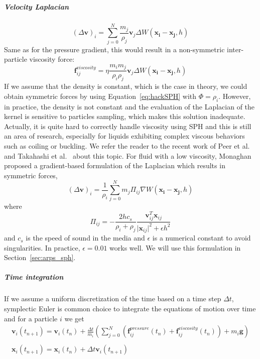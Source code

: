 \subparagraph{Velocity Laplacian}
\begin{equation}
\left(\Delta \mathbf{v}\right)_{i} = \sum_{j=0}^{N} \frac{m_{j}}{\rho_{j}} \mathbf{v}_{j} \Delta W(\mathbf{x_{i}}-\mathbf{x_{j}},h)
\end{equation}
Same as for the pressure gradient, this would result in a non-symmetric inter-particle viscosity force:
\begin{equation}
\label{eq:nonSymmetricViscosityForce}
\mathbf{f}^{viscosity}_{ij} = \eta\frac{m_{i}m_{j}}{\rho_{i}\rho_{j}}\mathbf{v}_{j}\Delta W(\mathbf{x_{i}}-\mathbf{x_{j}},h)
\end{equation}
If we assume that the density is constant, which is the case in theory, we could obtain symmetric forces by using Equation~\eqref{eq:hackSPH} with $\Phi=\rho_{i}$. However, in practice, the density is not constant and the evaluation of the Laplacian of the kernel is sensitive to particles sampling, which makes this solution inadequate.
Actually, it is quite hard to correctly handle viscosity using SPH and this is still an area of research, especially for liquids exhibiting complex viscous behaviors such as coiling or buckling.
We refer the reader to the recent work of Peer et al.~\cite{Peer2015} and Takahashi et al.~\cite{Takahashi2015} about this topic.
For fluid with a low viscosity, Monaghan~\cite{Monaghan2005} proposed a gradient-based formulation of the Laplacian which results in symmetric forces,
\begin{equation}
\label{eq:velocityLaplacianSPH}
\left(\Delta \mathbf{v}\right)_{i} = 
\frac{1}{\rho_{i}}
\sum_{j=0}^{N} m_{j} \Pi_{ij} \nabla W(\mathbf{x_{i}}-\mathbf{x_{j}},h)
\end{equation}
where 
\begin{equation}
    \Pi_{ij} = -\frac{2hc_{s}}{\rho_{i}+\rho_{j}}\frac{\mathbf{v}_{ij}^{T}\mathbf{x}_{ij}}{\vert \mathbf{x}_{ij} \vert^{2} + \epsilon h^{2}}
\end{equation}
and $c_{s}$ is the speed of sound in the media and $\epsilon$ is a numerical constant to avoid singularities.
In practice, $\epsilon=0.01$ works well. We will use this formulation in Section~\ref{sec:arps_sph}.
\subparagraph{Time integration} If we assume a uniform discretization of the time based on a time step $\Delta t$, symplectic Euler is common choice to integrate the equations of motion over time and for a particle $i$ we get
\begin{equation}
\begin{array}{ll}
\displaystyle \mathbf{v}_{i}(t_{n+1}) = \mathbf{v}_{i}(t_{n}) + \frac{\Delta t}{m_{i}}\left( \sum_{j=0}^{N}\left(\mathbf{f}_{ij}^{pressure}(t_{n})+\mathbf{f}_{ij}^{viscosity}(t_{n})\right)+m_{i}\mathbf{g}\right) \\ \\
\displaystyle \mathbf{x}_{i}(t_{n+1}) = \mathbf{x}_{i}(t_{n}) + \Delta t \mathbf{v}_{i}(t_{n+1})
\end{array}
\end{equation}
